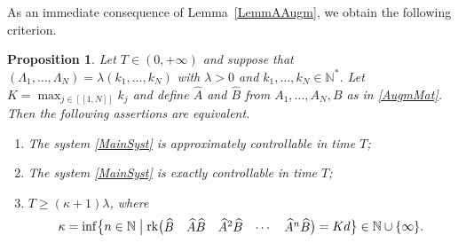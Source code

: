 \documentclass[JEP,XML,SOM,Unicode]{cedram}
\newcommand{\llbracket}{[\![}
\newcommand{\rrbracket}{]\!]}
\theoremstyle{plain}
\newtheorem{prop}[theo]{Proposition}
\theoremstyle{definition}
\DeclareMathOperator{\rank}{rk}
\begin{document}
As an immediate consequence of Lemma~\ref{LemmAAugm}, we obtain the following criterion.

\begin{prop}
\label{PropCommensurable}
Let $T \in (0, +\infty)$ and suppose that $(\Lambda_1, \dots, \Lambda_N) = \lambda (k_1, \dots, k_N)$ with $\lambda > 0$ and $k_1, \dots, k_N \in \mathbb N^\ast$. Let $K = \max_{j \in \llbracket 1, N\rrbracket} k_j$ and define $\widehat A$ and $\widehat B$ from $A_1, \dots, A_N, B$ as in \eqref{AugmMat}. Then the following assertions are equivalent.
\begin{enumerate}
\item\label{CtrlCommensurableApprox} The system \eqref{MainSyst} is approximately controllable in time $T$;
\item\label{CtrlCommensurableExact} The system \eqref{MainSyst} is exactly controllable in time $T$;
\item\label{CtrlCommensurableKalman} $T \geq (\kappa+1) \lambda$, where
\[
\kappa = \inf\bigl\{n \in \mathbb N \bigm| \rank\bigl(\begin{matrix}\widehat B & \widehat A \widehat B & \widehat A^2 \widehat B & \cdots & \widehat A^n \widehat B\end{matrix}\bigr) = K d\bigr\} \in \mathbb N \cup \{\infty\}.
\]
\end{enumerate}
\end{prop}
\end{document}

